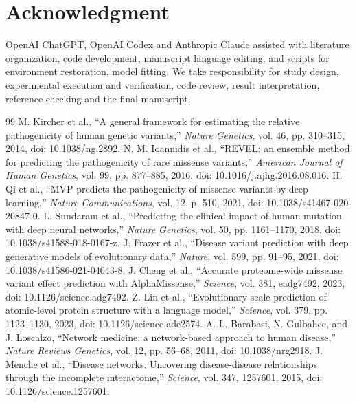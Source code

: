 \documentclass[conference]{IEEEtran}
\begin{document}
\section*{Acknowledgment}

OpenAI ChatGPT, OpenAI Codex and Anthropic Claude assisted with literature organization, code development, manuscript language editing, and scripts for environment restoration, model fitting. We take responsibility for study design, experimental execution and verification, code review, result interpretation, reference checking and the final manuscript.

\begin{thebibliography}{99}
 M. Kircher et al., ``A general framework for estimating the relative pathogenicity of human genetic variants,'' \emph{Nature Genetics}, vol. 46, pp. 310--315, 2014, doi: 10.1038/ng.2892.
 N. M. Ioannidis et al., ``REVEL: an ensemble method for predicting the pathogenicity of rare missense variants,'' \emph{American Journal of Human Genetics}, vol. 99, pp. 877--885, 2016, doi: 10.1016/j.ajhg.2016.08.016.
 H. Qi et al., ``MVP predicts the pathogenicity of missense variants by deep learning,'' \emph{Nature Communications}, vol. 12, p. 510, 2021, doi: 10.1038/s41467-020-20847-0.
 L. Sundaram et al., ``Predicting the clinical impact of human mutation with deep neural networks,'' \emph{Nature Genetics}, vol. 50, pp. 1161--1170, 2018, doi: 10.1038/s41588-018-0167-z.
 J. Frazer et al., ``Disease variant prediction with deep generative models of evolutionary data,'' \emph{Nature}, vol. 599, pp. 91--95, 2021, doi: 10.1038/s41586-021-04043-8.
 J. Cheng et al., ``Accurate proteome-wide missense variant effect prediction with AlphaMissense,'' \emph{Science}, vol. 381, eadg7492, 2023, doi: 10.1126/science.adg7492.
 Z. Lin et al., ``Evolutionary-scale prediction of atomic-level protein structure with a language model,'' \emph{Science}, vol. 379, pp. 1123--1130, 2023, doi: 10.1126/science.ade2574.
 A.-L. Barabasi, N. Gulbahce, and J. Loscalzo, ``Network medicine: a network-based approach to human disease,'' \emph{Nature Reviews Genetics}, vol. 12, pp. 56--68, 2011, doi: 10.1038/nrg2918.
 J. Menche et al., ``Disease networks. Uncovering disease-disease relationships through the incomplete interactome,'' \emph{Science}, vol. 347, 1257601, 2015, doi: 10.1126/science.1257601.

\end{thebibliography}
\end{document}
